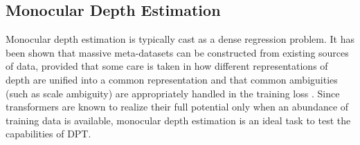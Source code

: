 \documentclass[10pt,twocolumn,letterpaper]{article}
\begin{document}
\begin{table}[b!]
  \centering {}
            \caption{Evaluation on KITTI (Eigen split). }
            \label{tab:mono_kitti}
          \end{table}


\subsection{Monocular Depth Estimation}
Monocular depth estimation is typically cast as a dense regression problem.
It has been shown that massive meta-datasets can be constructed from existing
sources of data, provided that some care is taken in how different
representations of depth are unified into a common representation and that
common ambiguities (such as scale ambiguity) are appropriately handled in the
training loss \cite{Ranftl2020}. Since transformers are known to realize their
full potential only when an abundance of training data is available, monocular
depth estimation is an ideal task to test the capabilities of DPT.
\end{document}
